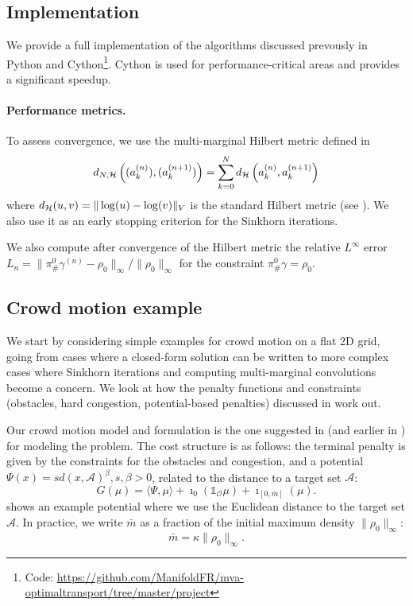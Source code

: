 \documentclass[../report.tex]{subfiles}
\begin{document}
\subsection{Implementation}

We provide a full implementation of the algorithms discussed prevously in Python and Cython\footnote{Code: \url{https://github.com/ManifoldFR/mva-optimaltransport/tree/master/project}}. Cython is used for performance-critical areas and provides a significant speedup.

\paragraph{Performance metrics.} To assess convergence, we use the multi-marginal Hilbert metric defined in \textcite[p.~16]{benamou2017generalizedIncompressible}
\begin{equation}
	d_{N,\mathcal{H}}\left((a_k^{(n)}), (a_k^{(n+1)})\right) =
	\sum_{k=0}^{N} d_{\mathcal{H}}\left(a_k^{(n)}, a_k^{(n+1)}\right)
\end{equation}
where $d_{\mathcal{H}}(u,v) = \| \log(u) - \log(v) \|_V$ is the standard Hilbert metric (see \cite{peyr2018computational}). We also use it as an early stopping criterion for the Sinkhorn iterations.

We also compute after convergence of the Hilbert metric the relative $L^\infty$ error $L_n = \| \pi^0_\#\gamma^{(n)} - \rho_0\|_\infty/\| \rho_0 \|_\infty$ for the constraint $\pi^0_\# \gamma = \rho_0$.


\subsection{Crowd motion example}

We start by considering simple examples for crowd motion on a flat 2D grid, going from cases where a closed-form solution can be written to more complex cases where Sinkhorn iterations and computing multi-marginal convolutions become a concern. We look at how the penalty functions and constraints (obstacles, hard congestion, potential-based penalties) discussed in \textcite{benamou:hal-01295299} work out.

Our crowd motion model and formulation is the one suggested in \textcite{benamou:hal-01295299} (and earlier in \textcite{peyr2015entropic}) for modeling the problem. The cost structure is as follows: the terminal penalty is given by the constraints for the obstacles and congestion, and a potential $\Psi(x) = sd(x, \mathscr A)^{\beta}, s,\beta > 0$, related to the distance to a target set $\mathscr{A}$:
\begin{equation}
	G(\mu) = \langle \Psi, \mu\rangle + \imath_{0}(\mathds{1}_{\mathscr O}\mu)
	+ \imath_{[0,\bar{m}]}(\mu).
\end{equation}
 shows an example potential where we use the Euclidean distance to the target set $\mathscr{A}$.
In practice, we write $\bar{m}$ as a fraction of the initial maximum density $\|\rho_0\|_\infty$:
\[
	\bar{m} = \kappa \|\rho_0\|_\infty.
\]
\end{document}
